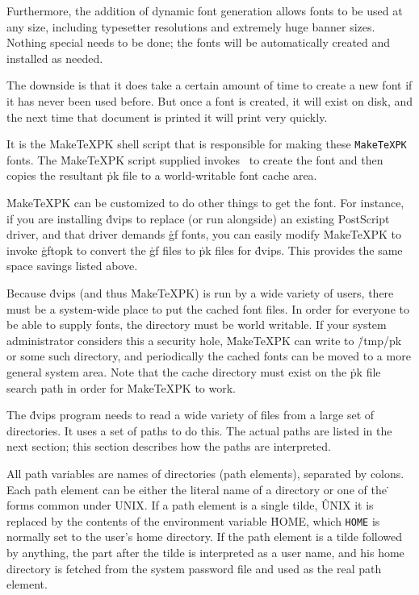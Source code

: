 Furthermore, the addition of dynamic font generation allows fonts to be
used at any size, including typesetter resolutions and extremely huge
banner sizes.  Nothing special needs to be done; the fonts will be
automatically created and installed as needed.

The downside is that it does take a certain amount of time to create a new
font if it has never been used before.  But once a font is created, it
will exist on disk, and the next time that document is printed it will print
very quickly.

It is the \.{MakeTeXPK} shell script that is responsible for making these
\^{{\tt MakeTeXPK}}
fonts.  The \.{MakeTeXPK} script supplied invokes \MF\ to create the font and
then copies the resultant \.{pk} file to a world-writable font cache area.

\.{MakeTeXPK} can be customized to do other things to get the font.  For
instance, if you are installing \.{dvips} to replace (or run alongside)
an existing PostScript driver, and that driver demands \.{gf} fonts, you
can easily modify \.{MakeTeXPK} to invoke \.{gftopk} to convert the
\.{gf} files to \.{pk} files for \.{dvips}.  This provides the same space
savings listed above.

Because \.{dvips} (and thus \.{MakeTeXPK}) is run by a wide variety of users,
there must be a system-wide place to put the cached font files.  In order
for everyone to be able to supply fonts, the directory must be world
writable.  If your system administrator considers this a security hole,
\.{MakeTeXPK} can write to \.{/tmp/pk} or some such directory, and
periodically the cached fonts can be moved to a more general system area.
Note that the cache directory must exist on the \.{pk} file search path
in order for \.{MakeTeXPK} to work.


The \.{dvips} program needs to read a wide variety of files from a large
set of directories.  It uses a set of paths to do this.  The actual
paths are listed in the next section; this section describes how the
paths are interpreted.

All path variables are names of directories (path elements),
separated by colons.
Each path element can be either the literal name of a directory or one
of the \.{\tilde} forms common under UNIX.  If a path element is a single tilde,
\^{UNIX}
it is replaced by the contents of the environment variable \.{HOME}, which
\^{{\tt HOME}}
is normally set to the user's home directory.  If the path element is
a tilde followed by anything, the part after the tilde is interpreted as
a user name, and his home directory is fetched from the system password
file and used as the real path element.

